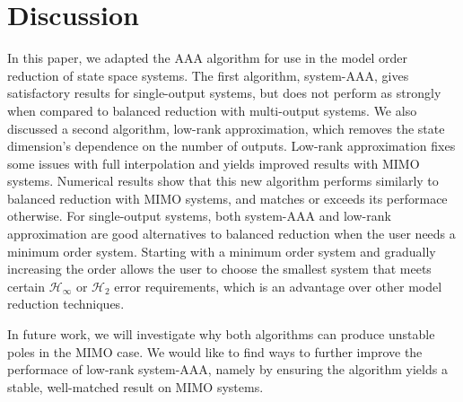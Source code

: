 \documentclass[letterpaper, 10 pt, conference]{ieeeconf}  %
\newcommand{\mcal}[1]{\mathcal{#1}}
\begin{document}
\section{Discussion}
In this paper, we adapted the AAA algorithm for use in the model order reduction of state space systems.  The first algorithm, system-AAA, gives satisfactory results for single-output systems, but does not perform as strongly when compared to balanced reduction with multi-output systems.  We also discussed a second algorithm, low-rank approximation, which removes the state dimension's dependence on the number of outputs.  Low-rank approximation fixes some issues with full interpolation and yields improved results with MIMO systems.  Numerical results show that this new algorithm performs similarly to balanced reduction with MIMO systems, and matches or exceeds its performace otherwise.  For single-output systems, both system-AAA and low-rank approximation are good alternatives to balanced reduction when the user needs a minimum order system.  Starting with a minimum order system and gradually increasing the order allows the user to choose the smallest system that meets certain \(\mcal{H}_\infty\) or \(\mcal{H}_2\) error requirements, which is an advantage over other model reduction techniques.  

In future work, we will investigate why both algorithms can produce unstable poles in the MIMO case.  We would like to find ways to further improve the performace of low-rank system-AAA, namely by ensuring the algorithm yields a stable, well-matched result on MIMO systems.  



\end{document}
